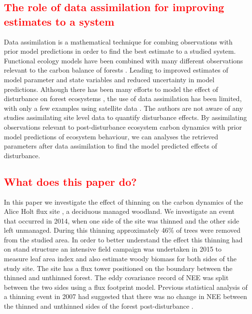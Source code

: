\documentclass[12pt]{article}
\begin{document}
\subsection{\textcolor{red}{The role of data assimilation for improving estimates to a system}}
Data assimilation is a mathematical technique for combing observations with prior model predictions in order to find the best estimate to a studied system. Functional ecology models have been combined with many different observations relevant to the carbon balance of forests \citep{zobitz2011primer, fox2009reflex, richardson2010estimating, Quaife2008, Zobitz2014, Niu2014}. Leading to improved estimates of model parameter and state variables and reduced uncertainty in model predictions. Although there has been many efforts to model the effect of disturbance on forest ecosystems \citep{seidl2011modelling, thornton2002modeling}, the use of data assimilation has been limited, with only a few examples using satellite data \citep{kantzas2015improving, hilker2009new}. The authors are not aware of any studies assimilating site level data to quantify disturbance effects. By assimilating observations relevant to post-disturbance ecosystem carbon dynamics with prior model predictions of ecosystem behaviour, we can analyses the retrieved parameters after data assimilation to find the model predicted effects of disturbance.   

\subsection{\textcolor{red}{What does this paper do?}}
In this paper we investigate the effect of thinning on the carbon dynamics of the Alice Holt flux site \citep{wilkinson2012inter}, a deciduous managed woodland. We investigate an event that occurred in 2014, when one side of the site was thinned and the other side left unmanaged. During this thinning approximately 46\% of trees were removed from the studied area. In order to better understand the effect this thinning had on stand structure an intensive field campaign was undertaken in 2015 to measure leaf area index and also estimate woody biomass for both sides of the study site. The site has a flux tower positioned on the boundary between the thinned and unthinned forest. The eddy covariance record of NEE was split between the two sides using a flux footprint model. Previous statistical analysis of a thinning event in 2007 had suggested that there was no change in NEE between the thinned and unthinned sides of the forest post-disturbance \citep{wilkinson2015effects}.  
\end{document}
